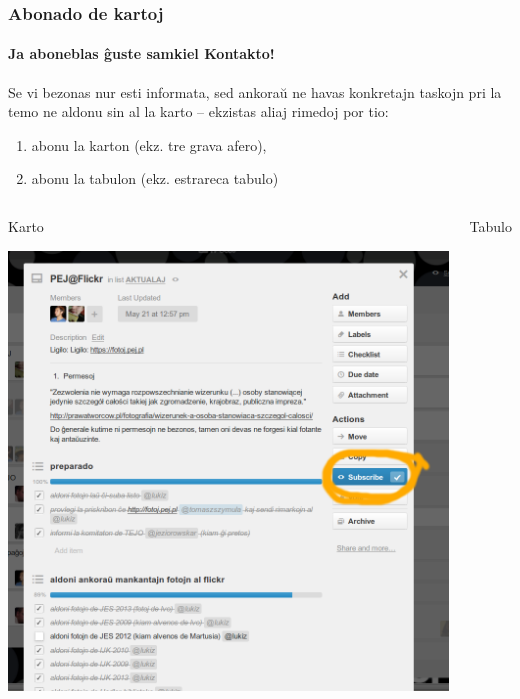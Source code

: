   \begin{frame}
    \frametitle{Abonado de kartoj}
    \framesubtitle{Ja aboneblas ĝuste samkiel Kontakto!}
		
	Se vi bezonas nur esti informata, sed ankoraŭ ne havas konkretajn taskojn pri la temo ne aldonu sin al la karto -- \alert{ekzistas aliaj rimedoj por tio}:
	\begin{enumerate}
		\item abonu la karton (ekz. tre grava afero),
		\item abonu la tabulon (ekz. estrareca tabulo)
	\end{enumerate}
	
	\begin{columns}
	    \begin{block}{Karto}
	    	\begin{center}
	     	\includegraphics[scale=0.10]{ekranoj/abonu-karton}
	    	\end{center}
    	\end{block}
    	\begin{block}{Tabulo}
    		\begin{center}

\end{center}
\end{block}
\end{columns}
\end{frame}
